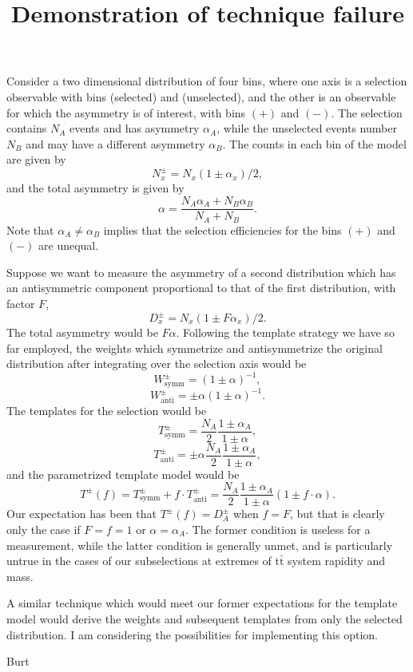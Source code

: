 \documentclass[letterpaper,11pt]{article}
\title{Demonstration of technique failure}
\begin{document}
\maketitle

Consider a two dimensional distribution of four bins, where one axis
is a selection observable with bins (selected) and (unselected), and
the other is an observable for which the asymmetry is of interest,
with bins $(+)$ and $(-)$.  The selection contains $N_A$ events and
has asymmetry $\alpha_A$, while the unselected events number $N_B$ and
may have a different asymmetry $\alpha_B$.  The counts in each bin of
the model are given by
\[N_x^{\pm} = N_x(1\pm\alpha_x)/2,\]
and the total asymmetry is given by
\[\alpha = \frac{N_A\alpha_A + N_B\alpha_B}{N_A+N_B}.\]
Note that $\alpha_A\ne\alpha_B$ implies that the selection
efficiencies for the bins $(+)$ and $(-)$ are unequal.

Suppose we want to measure the asymmetry of a second distribution
which has an antisymmetric component proportional to that of the first
distribution, with factor $F$,
\[D_x^{\pm} = N_x(1\pm F\alpha_x)/2.\]
The total asymmetry would be $F\alpha$. Following the template
strategy we have so far employed, the weights which symmetrize and
antisymmetrize the original distribution after integrating over the
selection axis would be
\[W^\pm_{\mathrm{symm}} = (1\pm\alpha)^{-1},\]
\[W^\pm_{\mathrm{anti}} = \pm\alpha(1\pm\alpha)^{-1}.\]
The templates for the selection would be
\[T^{\pm}_{\mathrm{symm}} = \frac{N_A}{2}\frac{1\pm\alpha_A}{1\pm\alpha},\]
\[T^{\pm}_{\mathrm{anti}} = \pm\alpha\frac{N_A}{2}\frac{1\pm\alpha_A}{1\pm\alpha},\]
and the parametrized template model would be
\[T^{\pm}(f) = T^{\pm}_{\mathrm{symm}} + f\cdot T^\pm_{\mathrm{anti}} = \frac{N_A}{2}\frac{1\pm\alpha_A}{1\pm\alpha}(1\pm f\cdot\alpha).\]
Our expectation has been that $T^\pm(f) = D^\pm_A$ when $f=F$, but
that is clearly only the case if $F=f=1$ or $\alpha=\alpha_A$.  The
former condition is useless for a measurement, while the latter
condition is generally unmet, and is particularly untrue in the cases
of our subselections at extremes of $\mathrm{t\bar{t}}$ system
rapidity and mass.

A similar technique which would meet our former expectations for the
template model would derive the weights and subsequent templates from
only the selected distribution.  I am considering the possibilities
for implementing this option.

\vspace{20pt}

\noindent
Burt
\end{document}

